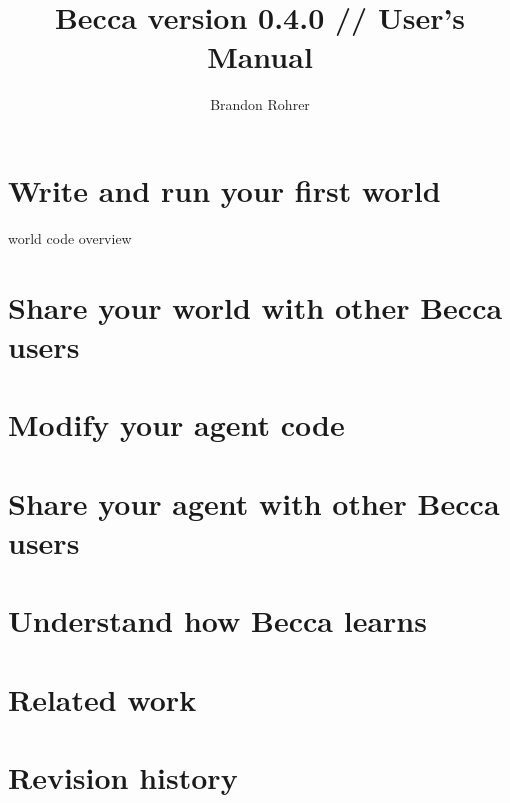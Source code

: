 ﻿\documentclass[12pt,oneside]{book}
\begin{document}
\title{Becca version 0.4.0 // User's Manual}
\author{Brandon Rohrer}

\maketitle
\tableofcontents
\newpage

\addtolength{\parskip}{\baselineskip}

\setcounter{tocdepth}{0}



\chapter{Write and run your first world}
world code overview

\chapter{Share your world with other Becca users}

\chapter{Modify your agent code}

\chapter{Share your agent with other Becca users}

\chapter{Understand how Becca learns}

\appendix
\chapter{Related work}

\chapter{Revision history}



\end{document}
